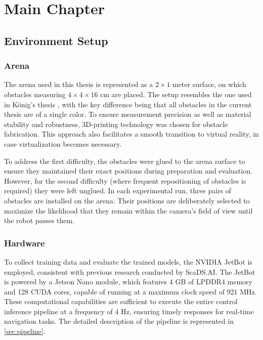 \chapter{Main Chapter}
\label{cha:Main}

\section{Environment Setup}

\subsection{Arena}

The arena used in this thesis is represented as a \(2 \times 1\) meter surface, on which obstacles measuring \(4 \times 4 \times 16\) cm are placed. The setup resembles the one used in König’s thesis \autocite{konig2022model}, with the key difference being that all obstacles in the current thesis are of a single color. To ensure measurement precision as well as material stability and robustness, 3D-printing technology was chosen for obstacle fabrication. This approach also facilitates a smooth transition to virtual reality, in case virtualization becomes necessary.

To address the first difficulty, the obstacles were glued to the arena surface to ensure they maintained their exact positions during preparation and evaluation. However, for the second difficulty (where frequent repositioning of obstacles is required) they were left unglued. In each experimental run, three pairs of obstacles are installed on the arena. Their positions are deliberately selected to maximize the likelihood that they remain within the camera’s field of view until the robot passes them.

\subsection{Hardware}

To collect training data and evaluate the trained models, the NVIDIA JetBot is employed, consistent with previous research conducted by ScaDS.AI. The JetBot is powered by a Jetson Nano module, which features 4 GB of LPDDR4 memory and 128 CUDA cores, capable of running at a maximum clock speed of 921 MHz. These computational capabilities are sufficient to execute the entire control inference pipeline at a frequency of 4 Hz, ensuring timely responses for real-time navigation tasks. The detailed description of the pipeline is represented in \autoref{sec:pipeline}.

